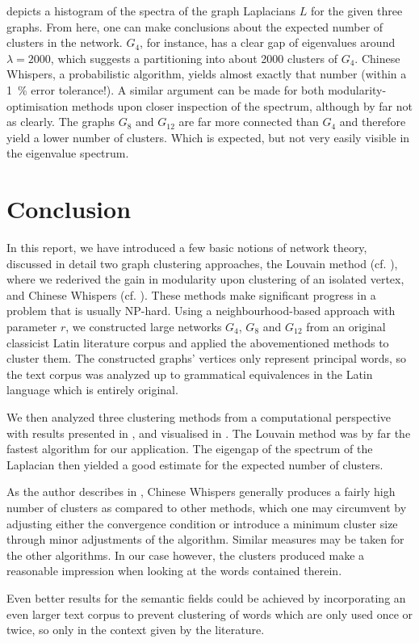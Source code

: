 \documentclass{prettytex/ox/mmsc-special-topic}
\begin{document}
   depicts a histogram of the spectra of the graph Laplacians $L$ for the given three graphs.
  From here, one can make conclusions about the expected number of clusters in the network. $G_4$, for instance, has a clear gap of eigenvalues around $\lambda = 2000$, which suggests a partitioning into about 2000 clusters of $G_4$. Chinese Whispers, a probabilistic algorithm, yields almost exactly that number (within a \SI{1}{\percent} error tolerance!).
  A similar argument can be made for both modularity-optimisation methods upon closer inspection of the spectrum, although by far not as clearly.
  The graphs $G_8$ and $G_{12}$ are far more connected than $G_4$ and therefore yield a lower number of clusters.
  Which is expected, but not very easily visible in the eigenvalue spectrum.

  \pagebreak
  \section{Conclusion}
  In this report, we have introduced a few basic notions of network theory, discussed in detail two graph clustering approaches, the Louvain method (cf. ), where we rederived the gain in modularity upon clustering of an isolated vertex, and Chinese Whispers (cf. ).
  These methods make significant progress in a problem that is usually NP-hard.
  Using a neighbourhood-based approach with parameter $r$, we constructed large networks $G_4$, $G_8$ and $G_{12}$ from an original classicist Latin literature corpus and applied the abovementioned methods to cluster them.
  The constructed graphs' vertices only represent principal words, so the text corpus was analyzed up to grammatical equivalences in the Latin language which is entirely original.

  We then analyzed three clustering methods from a computational perspective with results presented in ,  and visualised in .
  The Louvain method was by far the fastest algorithm for our application.
  The eigengap of the spectrum of the Laplacian then yielded a good estimate for the expected number of clusters.

  As the author describes in \cite{cw-biemann}, Chinese Whispers generally produces a fairly high number of clusters as compared to other methods, which one may circumvent by adjusting either the convergence condition or introduce a minimum cluster size through minor adjustments of the algorithm.
  Similar measures may be taken for the other algorithms.
  In our case however, the clusters produced make a reasonable impression when looking at the words contained therein.

  Even better results for the semantic fields could be achieved by incorporating an even larger text corpus to prevent clustering of words which are only used once or twice, so only in the context given by the literature.

  \pagebreak
  \printbibliography
\end{document}
